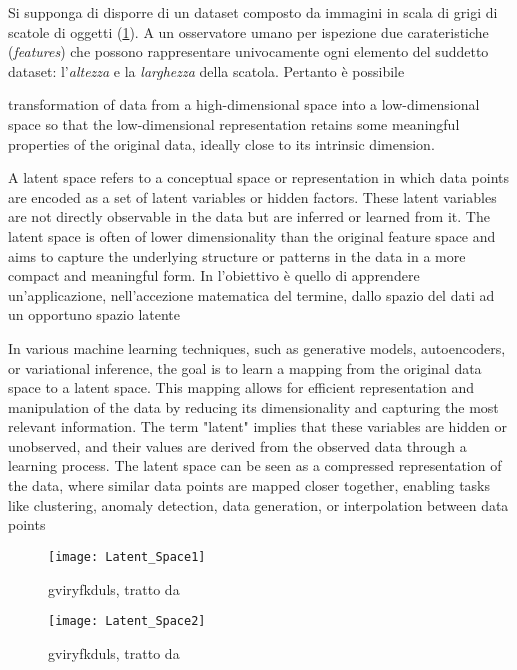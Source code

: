 Si supponga di disporre di un dataset composto da immagini in scala di grigi di scatole di oggetti (\ref{fig:t7ui}).
A un osservatore umano per ispezione due carateristiche (\emph{features}) che possono rappresentare univocamente ogni elemento del suddetto
dataset: l'\emph{altezza} e la \emph{larghezza} della scatola. Pertanto è possibile 



transformation of data from a high-dimensional space into a low-dimensional space so that the low-dimensional 
representation retains some meaningful properties of the original data, ideally close to its intrinsic dimension.

A latent space refers to a conceptual space or representation in which data points are encoded as a set of latent variables or hidden factors. 
These latent variables are not directly observable in the data but are inferred or learned from it. 
The latent space is often of lower dimensionality than the original feature space and aims to capture the underlying structure or patterns in the data in a more compact and meaningful form.
In l'obiettivo è quello di apprendere un'applicazione, nell'accezione matematica del termine, dallo spazio del dati ad un opportuno spazio latente

In various machine learning techniques, such as generative models, autoencoders, or variational inference, the goal is to learn a mapping from the original data space to a latent space. 
This mapping allows for efficient representation and manipulation of the data by reducing its dimensionality and capturing the most relevant information.
The term "latent" implies that these variables are hidden or unobserved, and their values are derived from the observed data through a learning process.
The latent space can be seen as a compressed representation of the data, where similar data points are mapped closer together, enabling tasks like clustering, anomaly detection, data generation,
or interpolation between data points

\begin{figure}
  \centering
  \texttt{[image: Latent\_Space1]}
  \caption{gviryfkduls, tratto da \cite{davidfosterGenerativeDeepLearning2023}}
  \label{fig:t7ui}
\end{figure}




\begin{figure}
  \centering
  \texttt{[image: Latent\_Space2]}
  \caption{gviryfkduls, tratto da \cite{davidfosterGenerativeDeepLearning2023}}
\end{figure}